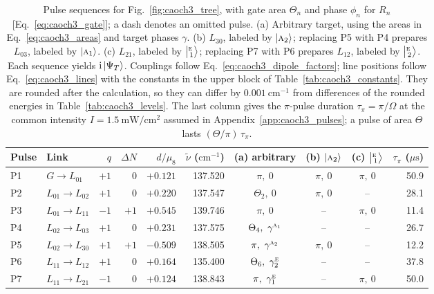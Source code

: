 \begin{table}[h]
\centering
\small
\caption{Pulse sequences for Fig.~\ref{fig:caoch3_tree}, with gate area $\Theta_n$ and phase $\phi_n$ for $R_n$ [Eq.~\eqref{eq:caoch3_gate}]; a dash denotes an omitted pulse. (a) Arbitrary target, using the areas in Eq.~\eqref{eq:caoch3_areas} and target phases $\gamma$. (b) $L_{30}$, labeled by $\ket{\text{\normalfont\scshape a}_{2}}$; replacing P5 with P4 prepares $L_{03}$, labeled by $\ket{\text{\normalfont\scshape a}_{1}}$. (c) $L_{21}$, labeled by $\bigl\lvert{}^{\text{\normalfont\scshape e}}_{\,1}\bigr\rangle$; replacing P7 with P6 prepares $L_{12}$, labeled by $\bigl\lvert{}^{\text{\normalfont\scshape e}}_{\,2}\bigr\rangle$. Each sequence yields $\mathrm{i}\ket{\Psi_T}$. Couplings follow Eq.~\eqref{eq:caoch3_dipole_factors}; line positions follow Eq.~\eqref{eq:caoch3_lines} with the constants in the upper block of Table~\ref{tab:caoch3_constants}. They are rounded after the calculation, so they can differ by $0.001\ \mathrm{cm^{-1}}$ from differences of the rounded energies in Table~\ref{tab:caoch3_levels}. The last column gives the $\pi$-pulse duration $\tau_\pi=\pi/\Omega$ at the common intensity $I=1.5\ \mathrm{mW/cm^2}$ assumed in Appendix~\ref{app:caoch3_pulses}; a pulse of area $\Theta$ lasts $(\Theta/\pi)\,\tau_\pi$.}
\label{tab:caoch3_pulses}
\begin{tabular}{llrrrrcccr}
\toprule
Pulse & Link & $q$ & $\Delta N$ & $d/\mu_8$ & $\tilde\nu$ ($\mathrm{cm^{-1}}$) & (a) arbitrary & (b) $\ket{\text{\normalfont\scshape a}_{2}}$ & (c) $\bigl\lvert{}^{\text{\normalfont\scshape e}}_{\,1}\bigr\rangle$ & $\tau_\pi$ ($\mu\mathrm{s}$)\\
\midrule
P1 & $G\to L_{01}$ & $+1$ & $0$ & $+0.121$ & 137.520 & $\pi,\ 0$ & $\pi,\ 0$ & $\pi,\ 0$ & 50.9\\
P2 & $L_{01}\to L_{02}$ & $+1$ & $0$ & $+0.220$ & 137.547 & $\Theta_2,\ 0$ & $\pi,\ 0$ & -- & 28.1\\
P3 & $L_{01}\to L_{11}$ & $-1$ & $+1$ & $+0.545$ & 139.746 & $\pi,\ 0$ & -- & $\pi,\ 0$ & 11.4\\
P4 & $L_{02}\to L_{03}$ & $+1$ & $0$ & $+0.231$ & 137.575 & $\Theta_4,\ \gamma^{\irr{a}_{1}}$ & -- & -- & 26.7\\
P5 & $L_{02}\to L_{30}$ & $+1$ & $+1$ & $-0.509$ & 138.505 & $\pi,\ \gamma^{\irr{a}_{2}}$ & $\pi,\ 0$ & -- & 12.2\\
P6 & $L_{11}\to L_{12}$ & $+1$ & $0$ & $+0.164$ & 135.400 & $\Theta_6,\ \gamma^{\irr{e}}_{2}$ & -- & -- & 37.8\\
P7 & $L_{11}\to L_{21}$ & $-1$ & $0$ & $+0.124$ & 138.843 & $\pi,\ \gamma^{\irr{e}}_{1}$ & -- & $\pi,\ 0$ & 50.0\\
\bottomrule
\end{tabular}
\end{table}

